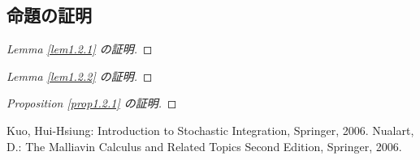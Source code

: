 \documentclass[a4paper,10pt]{jsarticle}
\theoremstyle{plain}
\begin{document}
\subsection{命題の証明}
\begin{proof}[Lemma \ref{lem1.2.1} の証明]
\end{proof}
\begin{proof}[Lemma \ref{lem1.2.2} の証明]
\end{proof}
\begin{proof}[Proposition \ref{prop1.2.1} の証明]
\end{proof}

\begin{thebibliography}{5}
	 Kuo, Hui-Hsiung: Introduction to Stochastic Integration, Springer, 2006.
	 Nualart, D.: The Malliavin Calculus and Related Topics Second Edition, Springer, 2006.
\end{thebibliography}
\end{document}
